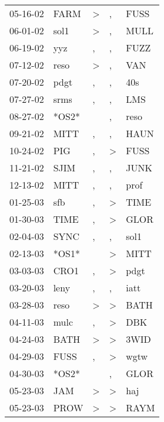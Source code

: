 \begin{supertabular}{lllll}
 05-16-02 &   FARM &     \textgreater &                , &   FUSS \\
 06-01-02 &   sol1 &     \textgreater &                , &   MULL \\
 06-19-02 &    yyz &                , &                , &   FUZZ \\
 07-12-02 &   reso &     \textgreater &                , &    VAN \\
 07-20-02 &   pdgt &                , &                , &    40s \\
 07-27-02 &   srms &                , &                , &    LMS \\
 08-27-02 &  *OS2* &                  &                , &   reso \\
 09-21-02 &   MITT &                , &                , &   HAUN \\
 10-24-02 &    PIG &                , &     \textgreater &   FUSS \\
 11-21-02 &   SJIM &                , &                , &   JUNK \\
 12-13-02 &   MITT &                , &                , &   prof \\
 01-25-03 &    sfb &                , &     \textgreater &   TIME \\
 01-30-03 &   TIME &                , &     \textgreater &   GLOR \\
 02-04-03 &   SYNC &                , &                , &   sol1 \\
 02-13-03 &  *OS1* &                  &     \textgreater &   MITT \\
 03-03-03 &   CRO1 &                , &     \textgreater &   pdgt \\
 03-20-03 &   leny &                , &                , &   iatt \\
 03-28-03 &   reso &     \textgreater &     \textgreater &   BATH \\
 04-11-03 &   mulc &                , &     \textgreater &    DBK \\
 04-24-03 &   BATH &     \textgreater &     \textgreater &   3WID \\
 04-29-03 &   FUSS &                , &     \textgreater &   wgtw \\
 04-30-03 &  *OS2* &                  &                , &   GLOR \\
 05-23-03 &    JAM &     \textgreater &     \textgreater &    haj \\
 05-23-03 &   PROW &     \textgreater &     \textgreater &   RAYM \\

\end{supertabular}
